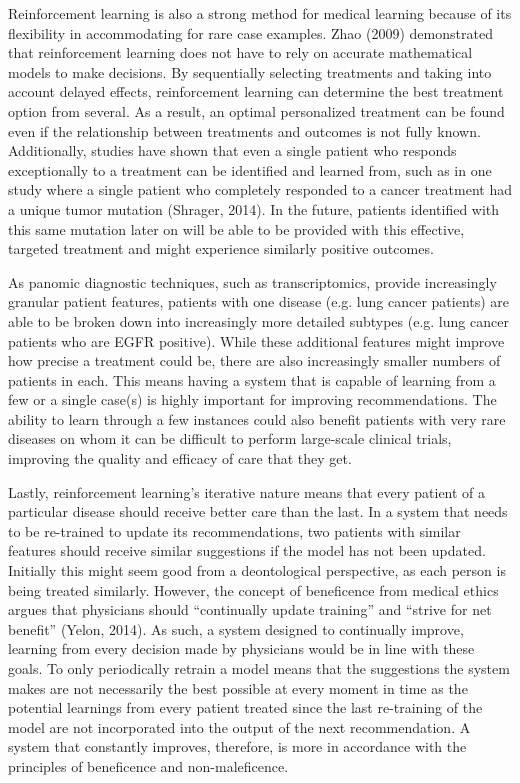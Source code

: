 \documentclass[]{spie}  %
\begin{document}
Reinforcement learning is also a strong method for medical learning because of its flexibility in accommodating for rare case examples. Zhao (2009) demonstrated that reinforcement learning does not have to rely on accurate mathematical models to make decisions. By sequentially selecting treatments and taking into account delayed effects, reinforcement learning can determine the best treatment option from several. As a result, an optimal personalized treatment can be found even if the relationship between treatments and outcomes is not fully known. Additionally, studies have shown that even a single patient who responds exceptionally to a treatment can be identified and learned from, such as in one study where a single patient who completely responded to a cancer treatment had a unique tumor mutation (Shrager, 2014). In the future, patients identified with this same mutation later on will be able to be provided with this effective, targeted treatment and might experience similarly positive outcomes.

As panomic diagnostic techniques, such as transcriptomics, provide increasingly granular patient features, patients with one disease (e.g. lung cancer patients) are able to be broken down into increasingly more detailed subtypes (e.g. lung cancer patients who are EGFR positive). While these additional features might improve how precise a treatment could be, there are also increasingly smaller numbers of patients in each. This means having a system that is capable of learning from a few or a single case(s) is highly important for improving recommendations. The ability to learn through a few instances could also benefit patients with very rare diseases on whom it can be difficult to perform large-scale clinical trials, improving the quality and efficacy of care that they get.

Lastly, reinforcement learning’s iterative nature means that every patient of a particular disease should receive better care than the last. In a system that needs to be re-trained to update its recommendations, two patients with similar features should receive similar suggestions if the model has not been updated. Initially this might seem good from a deontological perspective, as each person is being treated similarly. However, the concept of beneficence from medical ethics argues that physicians should “continually update training” and “strive for net benefit” (Yelon, 2014). As such, a system designed to continually improve, learning from every decision made by physicians would be in line with these goals. To only periodically retrain a model means that the suggestions the system makes are not necessarily the best possible at every moment in time as the potential learnings from every patient treated since the last re-training of the model are not incorporated into the output of the next recommendation. A system that constantly improves, therefore, is more in accordance with the principles of beneficence and non-maleficence.
\end{document}
